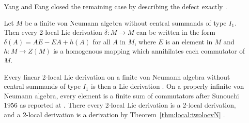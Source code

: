 Yang and Fang closed the remaining case by describing the defect exactly
\cite[p.~244]{YangFang2019}.

\begin{theorem}\label{thm:local:yangfang}
Let $M$ be a finite von Neumann algebra without central summands of type
$I_1$. Then every 2-local Lie derivation $\delta\colon M\to M$ can be
written in the form $\delta(A)=AE-EA+h(A)$ for all $A$ in $M$, where $E$
is an element in $M$ and $h\colon M\to Z(M)$ is a homogenous mapping which
annihilates each commutator of $M$.
\end{theorem}

Every linear 2-local Lie derivation on a finite von Neumann algebra
without central summands of type $I_1$ is then a Lie derivation
\cite[Corollary~2.6, p.~250]{YangFang2019}. On a properly infinite von
Neumann algebra, every element is a finite sum of commutators after
Sunouchi 1956 as reported at \cite[p.~244]{YangFang2019}. There every
2-local Lie derivation is a 2-local derivation, and a 2-local derivation
is a derivation by Theorem~\ref{thm:local:twolocvN}
\cite[p.~244]{YangFang2019}.
